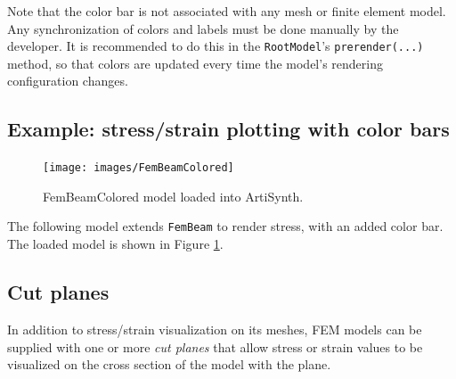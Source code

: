 Note that the color bar is not associated with any mesh or finite element model.
Any synchronization of colors and labels must be done manually by the developer.
It is recommended to do this in the {\tt RootModel}'s {\tt prerender(...)} method,
so that colors are updated every time the model's rendering configuration changes.

\subsection{Example: stress/strain plotting with color bars}

\begin{figure}[ht]
	\centering
	\texttt{[image: images/FemBeamColored]}
	\caption{FemBeamColored model loaded into ArtiSynth.}
	\label{fig:fem:beamcolored}
\end{figure}

The following model extends {\tt FemBeam} to render stress, with an added 
color bar.  The loaded model is shown in Figure \ref{fig:fem:beamcolored}.
\lstset{numbers=left}

\lstset{numbers=none}

\subsection{Cut planes}
\label{FemCutPlanes:sec}

In addition to stress/strain visualization on its meshes, FEM models
can be supplied with one or more {\it cut planes} that allow stress or
strain values to be visualized on the cross section of the model with
the plane.

